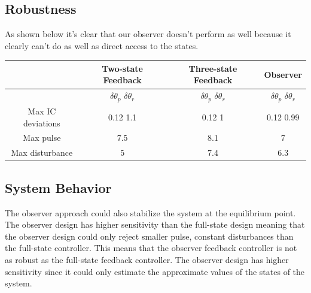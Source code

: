 \subsection{Robustness}
As shown below it's clear that our observer doesn't perform as well because it clearly can't do as well as direct access to the states.\\
\begin{tabular}{|c|c|c|c|}
\hline
 & Two-state Feedback & Three-state Feedback & Observer\\ \hline
 & $\delta\theta_p$  $\delta\theta_r$ & $\delta\theta_p$  $\delta\theta_r$ & $\delta\theta_p$  $\delta\theta_r$\\ \hline
Max IC deviations & 0.12  1.1 & 0.12  1 & 0.12  0.99\\ \hline
Max pulse & 7.5 & 8.1 & 7\\ \hline
Max disturbance & 5 & 7.4 & 6.3\\
\hline
\end{tabular}
\subsection{System Behavior}
The observer approach could also stabilize the system at the equilibrium point. The observer design has higher sensitivity than the full-state design meaning that the observer design could only reject smaller pulse, constant disturbances than the full-state controller. This means that the observer feedback controller is not as robust as the full-state feedback controller. The observer design has higher sensitivity since it could only estimate the approximate values of the states of the system.